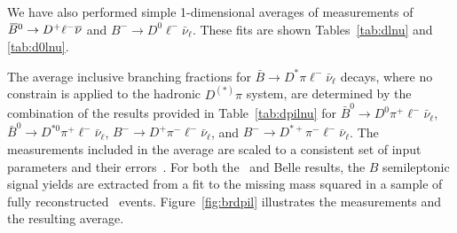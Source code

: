 We have also performed simple 1-dimensional averages of measurements
of $\kern 0.18em\overline{\kern -0.18em B}{}^0 \to D^{+}\ell^{-}\overline{\nu}$ and $B^-\to D^0\ell^-\bar\nu_\ell$. These fits are
shown Tables~\ref{tab:dlnu} and \ref{tab:d0lnu}.




\label{slbdecays_dpilnu}

The average inclusive branching fractions for $\bar{B} \to D^{*}\pi \ell^-\bar{\nu}_{\ell}$
decays, where no constrain is applied to the hadronic $D^{(*)}\pi$ system, 
are determined by the
combination of the results provided in Table~\ref{tab:dpilnu} for 
$\bar{B}^0 \to D^0 \pi^+ \ell^-\bar{\nu}_{\ell}$, $\bar{B}^0 \to D^{*0} \pi^+
\ell^-\bar{\nu}_{\ell}$, 
$B^- \to D^+ \pi^-
\ell^-\bar{\nu}_{\ell}$, and $B^- \to D^{*+} \pi^- \ell^-\bar{\nu}_{\ell}$.
The measurements included in the average 
are scaled to a consistent set of input
parameters and their errors~\cite{HFAG_sl:inputparams}.
For both the \babar\ and Belle results, the $B$ semileptonic signal yields are
 extracted from a fit to the missing mass squared in a sample of fully
 reconstructed \BB\ events.  
Figure~\ref{fig:brdpil} illustrates the measurements and the
resulting average.



